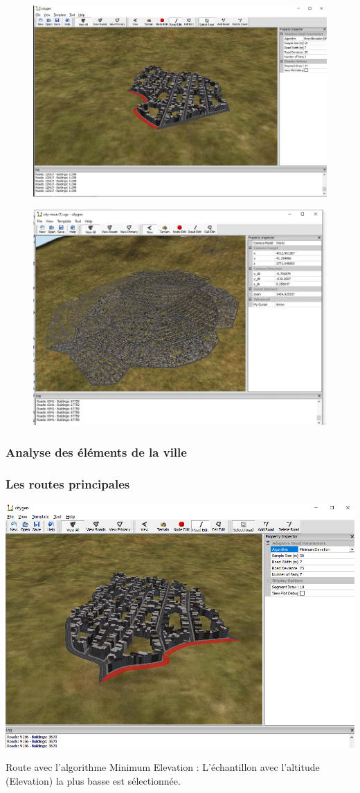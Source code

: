 \begin{figure} 
\begin{minipage}[c]{.46\linewidth}
	\includegraphics[height = 5 cm]{images/figure4.png}\\
\end{minipage} \hfill 
\begin{minipage}[c]{.46\linewidth}
	\includegraphics[height = 5 cm]{images/figure5.png}\\
\end{minipage}
\end{figure}

\subsubsection{Analyse des éléments de la ville}

\subsubsection{\textbf{Les routes principales}}

\begin{center}
\includegraphics[height = 5 cm]{images/figure6.png}\\
\end{center}
Route avec l'algorithme Minimum Elevation :
L'échantillon avec l'altitude (Elevation) la plus basse est sélectionnée.

